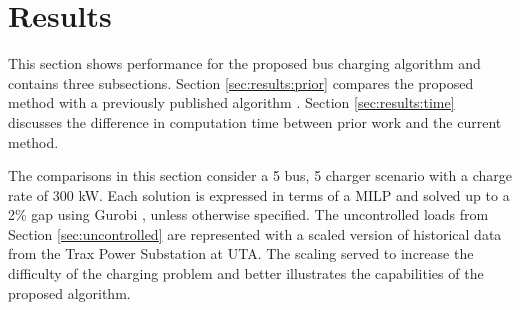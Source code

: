 \section{Results\label{sec:results}}
This section shows performance for the proposed bus charging algorithm and contains three subsections. Section \ref{sec:results:prior} compares the proposed method with a previously published algorithm \cite{He_2019_Fast}. Section \ref{sec:results:time} discusses the difference in computation time between prior work and the current method.
\par The comparisons in this section consider a 5 bus, 5 charger scenario with a charge rate of 300 kW. Each solution is expressed in terms of a MILP and solved up to a 2\% gap using Gurobi \cite{gurobi}, unless otherwise specified. The uncontrolled loads from Section \ref{sec:uncontrolled} are represented with a scaled version of historical data from the Trax Power Substation at UTA. The scaling served to increase the difficulty of the charging problem and better illustrates the capabilities of the proposed algorithm. 

